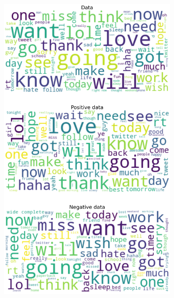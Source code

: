 \documentclass{article}
\begin{document}
\begin{itemize}
\begin{figure}[H]
\begin{subfigure}[b]{0.24\textwidth}
      \includegraphics[width=\textwidth]{chapter-06/section-01-01/17/visualization/2/wordcloud.png}
    \end{subfigure}
    \begin{subfigure}[b]{0.24\textwidth}
      \centering

\end{subfigure}
\end{figure}
\end{itemize}
\end{document}
